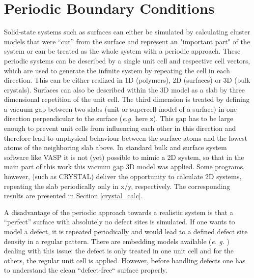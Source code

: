 \documentclass[11pt,DIV=13,BCOR=5mm,a4paper,headinclude]{scrbook}
\begin{document}
\section{Periodic Boundary Conditions}
Solid-state systems such as surfaces can either be simulated by calculating cluster models that were ``cut'' from the surface and represent an "important part" of the system or can be treated as the whole system with a periodic approach.
These periodic systems can be described by a single unit cell and respective cell vectors, which are used to generate the infinite system by repeating the cell in each direction.
This can be either realized in 1D (polymers), 2D (surfaces) or 3D (bulk crystals).
Surfaces can also be described within the 3D model as a slab by three dimensional repetition of the unit cell.
The third dimension is treated by defining a vacuum gap between two slabs (unit or supercell model of a surface) in one direction perpendicular to the surface (\textit{e.g.} here z).
This gap has to be large enough to prevent unit cells from influencing each other in this direction and therefore lead to unphysical behaviour between the surface atoms and the lowest atoms of the neighboring slab above.
In standard bulk and surface system software like VASP\cite{kresse1993,kresse2,kresse3,kresse4,kresse99} it is not (yet) possible to mimic a 2D system, so that in the main part of this work this vacuum gap 3D model was applied.
Some programs, however, (such as CRYSTAL\cite{crystal14}) %
deliver the opportunity to calculate 2D systems, repeating the slab periodically only in x/y, respectively.
The corresponding results are presented in Section \ref{crystal_calc}.


A disadvantage of the periodic approach towards a realistic system is that a ``perfect'' surface with absolutely no defect sites is simulated.
If one wants to model a defect, it is repeated periodically and would lead to a defined defect site density in a regular pattern.
There are embedding models available (\textit{e.
g.} \cite{Sauer2004}) dealing with this issue: the defect is only treated in one unit cell and for the others, the regular unit cell is applied.
However, before handling defects one has to understand the clean ``defect-free`` surface properly.
\end{document}
